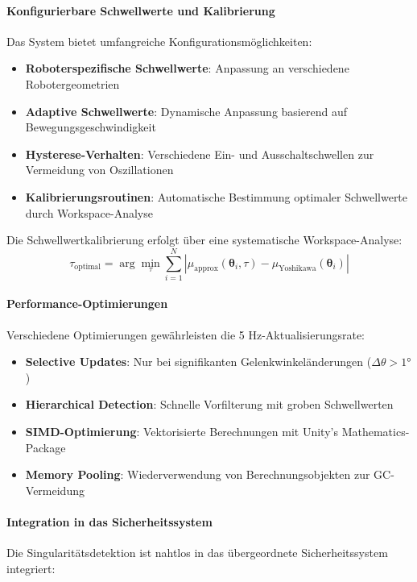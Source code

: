 \paragraph{Konfigurierbare Schwellwerte und Kalibrierung}
Das System bietet umfangreiche Konfigurationsmöglichkeiten:

\begin{itemize}
    \item \textbf{Roboterspezifische Schwellwerte}: Anpassung an verschiedene Robotergeometrien
    \item \textbf{Adaptive Schwellwerte}: Dynamische Anpassung basierend auf Bewegungsgeschwindigkeit
    \item \textbf{Hysterese-Verhalten}: Verschiedene Ein- und Ausschaltschwellen zur Vermeidung von Oszillationen
    \item \textbf{Kalibrierungsroutinen}: Automatische Bestimmung optimaler Schwellwerte durch Workspace-Analyse
\end{itemize}

Die Schwellwertkalibrierung erfolgt über eine systematische Workspace-Analyse:
\begin{equation}
    \tau_{\text{optimal}} = \arg\min_{\tau} \sum_{i=1}^{N} |\mu_{\text{approx}}(\boldsymbol{\theta}_i, \tau) - \mu_{\text{Yoshikawa}}(\boldsymbol{\theta}_i)|
\end{equation}

\paragraph{Performance-Optimierungen}
Verschiedene Optimierungen gewährleisten die 5 Hz-Aktualisierungsrate:

\begin{itemize}
    \item \textbf{Selective Updates}: Nur bei signifikanten Gelenkwinkeländerungen ($\Delta\theta > 1°$)
    \item \textbf{Hierarchical Detection}: Schnelle Vorfilterung mit groben Schwellwerten
    \item \textbf{SIMD-Optimierung}: Vektorisierte Berechnungen mit Unity's Mathematics-Package
    \item \textbf{Memory Pooling}: Wiederverwendung von Berechnungsobjekten zur GC-Vermeidung
\end{itemize}

\paragraph{Integration in das Sicherheitssystem}
Die Singularitätsdetektion ist nahtlos in das übergeordnete Sicherheitssystem
integriert:

